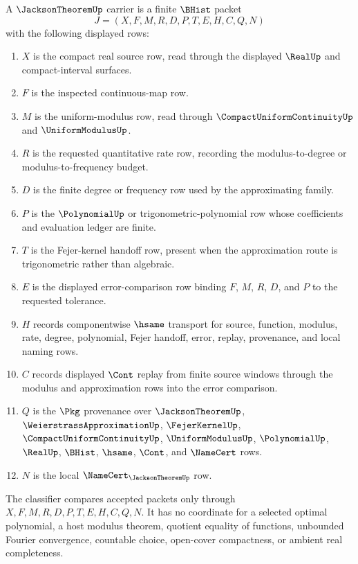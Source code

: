 \begin{definition}
\label{def:jackson-theorem-carrier}
A $\JacksonTheoremUp$ carrier is a finite $\BHist$ packet
$$
J=(X,F,M,R,D,P,T,E,H,C,Q,N)
$$
with the following displayed rows:
\begin{enumerate}
\item $X$ is the compact real source row, read through the displayed $\RealUp$ and compact-interval surfaces.
\item $F$ is the inspected continuous-map row.
\item $M$ is the uniform-modulus row, read through $\CompactUniformContinuityUp$ and $\UniformModulusUp$.
\item $R$ is the requested quantitative rate row, recording the modulus-to-degree or modulus-to-frequency budget.
\item $D$ is the finite degree or frequency row used by the approximating family.
\item $P$ is the $\PolynomialUp$ or trigonometric-polynomial row whose coefficients and evaluation ledger are finite.
\item $T$ is the Fejer-kernel handoff row, present when the approximation route is trigonometric rather than algebraic.
\item $E$ is the displayed error-comparison row binding $F$, $M$, $R$, $D$, and $P$ to the requested tolerance.
\item $H$ records componentwise $\hsame$ transport for source, function, modulus, rate, degree, polynomial, Fejer handoff, error, replay, provenance, and local naming rows.
\item $C$ records displayed $\Cont$ replay from finite source windows through the modulus and approximation rows into the error comparison.
\item $Q$ is the $\Pkg$ provenance over $\JacksonTheoremUp$, $\WeierstrassApproximationUp$, $\FejerKernelUp$, $\CompactUniformContinuityUp$, $\UniformModulusUp$, $\PolynomialUp$, $\RealUp$, $\BHist$, $\hsame$, $\Cont$, and $\NameCert$ rows.
\item $N$ is the local $\NameCert_{\JacksonTheoremUp}$ row.
\end{enumerate}
The classifier compares accepted packets only through $X,F,M,R,D,P,T,E,H,C,Q,N$. It has no coordinate for a selected optimal polynomial, a host modulus theorem, quotient equality of functions, unbounded Fourier convergence, countable choice, open-cover compactness, or ambient real completeness.
\end{definition}

